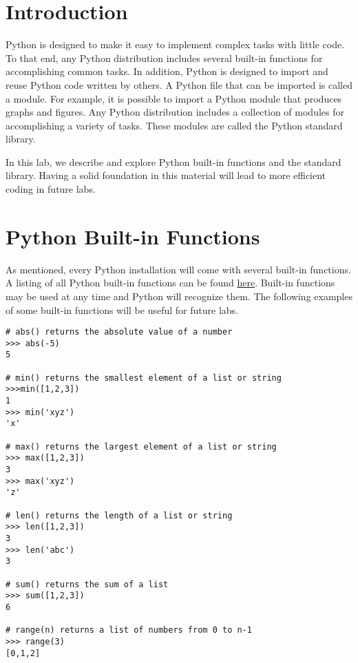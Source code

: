 \label{lab:Standard Library}

\section*{Introduction}

Python is designed to make it easy to implement complex tasks with little code.
To that end, any Python distribution includes several built-in functions for accomplishing common tasks.
In addition, Python is designed to import and reuse Python code written by others.
A Python file that can be imported is called a module.
For example, it is possible to import a Python module that produces graphs and figures.
Any Python distribution includes a collection of modules for accomplishing a variety of tasks.
These modules are called the Python standard library.

In this lab, we describe and explore Python built-in functions and the standard library.
Having a solid foundation in this material will lead to more efficient coding in future labs.

\section*{Python Built-in Functions}

As mentioned, every Python installation will come with several built-in functions.
A listing of all Python built-in functions can be found \href{https://docs.python.org/2/library/functions.html}{here}.
Built-in functions may be used at any time and Python will recognize them.
The following examples of some built-in functions will be useful for future labs.

\begin{lstlisting}
# abs() returns the absolute value of a number
>>> abs(-5)
5

# min() returns the smallest element of a list or string
>>>min([1,2,3])
1
>>> min('xyz')
'x'

# max() returns the largest element of a list or string
>>> max([1,2,3])
3
>>> max('xyz')
'z'

# len() returns the length of a list or string
>>> len([1,2,3])
3
>>> len('abc')
3

# sum() returns the sum of a list
>>> sum([1,2,3])
6

# range(n) returns a list of numbers from 0 to n-1
>>> range(3)
[0,1,2]
\end{lstlisting}

